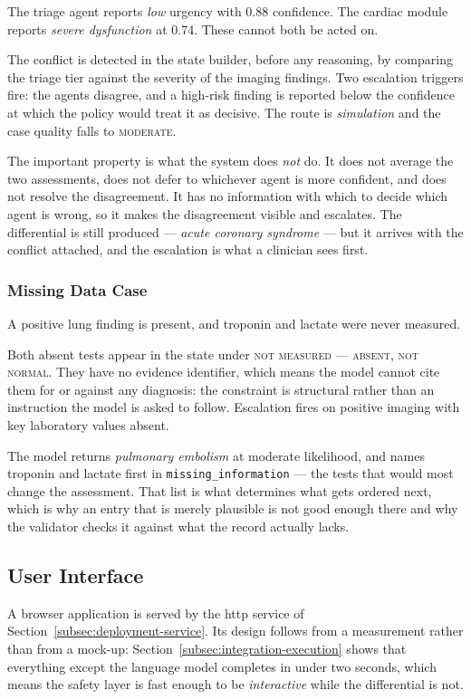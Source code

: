 The triage agent reports \emph{low} urgency with 0.88 confidence. The cardiac module reports
\emph{severe dysfunction} at 0.74. These cannot both be acted on.

The conflict is detected in the state builder, before any reasoning, by comparing the triage
tier against the severity of the imaging findings. Two escalation triggers fire: the agents
disagree, and a high-risk finding is reported below the confidence at which the policy would
treat it as decisive. The route is \emph{simulation} and the case quality falls to
\textsc{moderate}.

The important property is what the system does \emph{not} do. It does not average the two
assessments, does not defer to whichever agent is more confident, and does not resolve the
disagreement. It has no information with which to decide which agent is wrong, so it makes the
disagreement visible and escalates. The differential is still produced --- \emph{acute coronary
syndrome} --- but it arrives with the conflict attached, and the escalation is what a clinician
sees first.

\subsubsection{Missing Data Case}

A positive lung finding is present, and troponin and lactate were never measured.

Both absent tests appear in the state under \textsc{not measured --- absent, not normal}. They
have no evidence identifier, which means the model cannot cite them for or against any
diagnosis: the constraint is structural rather than an instruction the model is asked to
follow. Escalation fires on positive imaging with key laboratory values absent.

The model returns \emph{pulmonary embolism} at moderate likelihood, and names troponin and
lactate first in \texttt{missing\_information} --- the tests that would most change the
assessment. That list is what determines what gets ordered next, which is why an entry that is
merely plausible is not good enough there and why the validator checks it against what the
record actually lacks.

\subsection{User Interface}
\label{subsec:integration-ui}

A browser application is served by the \gls{http} service of
Section~\ref{subsec:deployment-service}. Its design follows from a measurement rather than from
a mock-up: Section~\ref{subsec:integration-execution} shows that everything except the language
model completes in under two seconds, which means the safety layer is fast enough to be
\emph{interactive} while the differential is not.

